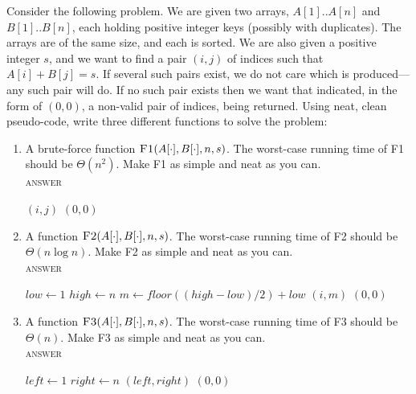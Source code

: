 \documentclass[11pt]{article}
\begin{document}
Consider the following problem.
We are given two arrays, $A[1]..A[n]$ and $B[1]..B[n]$,
each holding positive integer keys (possibly with duplicates).
The arrays are of the same size, and each is sorted.
We are also given a positive integer $s$, and we want to find a
pair $(i,j)$ of indices such that $A[i] + B[j] = s$.
If several such pairs exist, we do not care which is produced---any
such pair will do.
If no such pair exists then we want that indicated,
in the form of $(0,0)$, a non-valid pair of indices, being returned.
Using neat, clean pseudo-code, write three different functions to
solve the problem:
\begin{enumerate}
\setlength{\itemsep}{-0.4ex}
\item
A brute-force function $\textsc{F1}(A[\cdot],B[\cdot],n,s)$.
The worst-case running time of \textsc{F1} should be $\Theta(n^2)$.
Make \textsc{F1} as simple and neat as you can.
\\
\textsc{answer}
\par
\begin{algorithmic}
      \State \Return $(i, j)$
    \EndIf
  \EndFor
\EndFor
\State \Return $(0, 0)$
\EndFunction
\end{algorithmic}
\item
A function
$\textsc{F2}(A[\cdot],B[\cdot],n,s)$.
The worst-case running time of \textsc{F2} should be $\Theta(n \log n)$.
Make \textsc{F2} as simple and neat as you can.
\\
\textsc{answer}
\par
\begin{algorithmic}
      \State $low \gets 1$
      \State $high \gets n$
      \State $m \gets floor((high - low)/2) + low$
        \State \Return $(i, m)$
      \Else
      \EndIf
    \EndWhile
    \EndFor
  \State \Return $(0,0)$
  \EndFunction

\end{algorithmic}
\item
A function $\textsc{F3}(A[\cdot],B[\cdot],n,s)$.
The worst-case running time of \textsc{F3} should be $\Theta(n)$.
Make \textsc{F3} as simple and neat as you can.
\\
\textsc{answer}
\par
\begin{algorithmic}
    \State $left \gets 1$
    \State $right \gets n$
      \State \Return $(left, right)$
    \Else
    \EndIf
    \EndWhile
  \State \Return $(0,0)$
  \EndFunction
\end{algorithmic}
\end{enumerate}
\pagebreak
\end{document}
